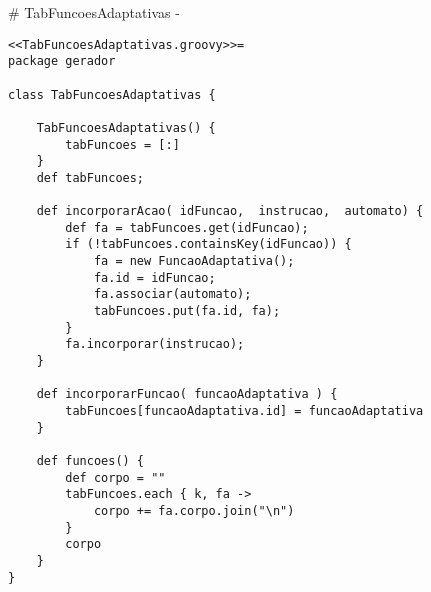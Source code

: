 # TabFuncoesAdaptativas {-}

\begin{lstlisting}
<<TabFuncoesAdaptativas.groovy>>=
package gerador

class TabFuncoesAdaptativas {

    TabFuncoesAdaptativas() {
        tabFuncoes = [:]
    }
    def tabFuncoes;

    def incorporarAcao( idFuncao,  instrucao,  automato) {
        def fa = tabFuncoes.get(idFuncao);
        if (!tabFuncoes.containsKey(idFuncao)) {
            fa = new FuncaoAdaptativa();
            fa.id = idFuncao;
            fa.associar(automato);
            tabFuncoes.put(fa.id, fa);
        }
        fa.incorporar(instrucao);
    }

    def incorporarFuncao( funcaoAdaptativa ) {
        tabFuncoes[funcaoAdaptativa.id] = funcaoAdaptativa
    }

    def funcoes() {
        def corpo = ""
        tabFuncoes.each { k, fa ->
            corpo += fa.corpo.join("\n")
        }
        corpo
    }
}



\end{lstlisting}

